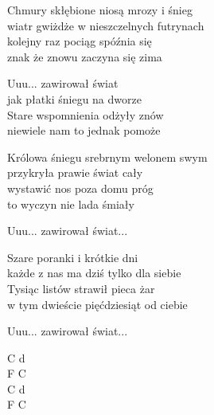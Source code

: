 \begin{text}
    Chmury skłębione niosą mrozy i śnieg\\
    wiatr gwiżdże w nieszczelnych futrynach\\
    kolejny raz pociąg spóźnia się\\
    znak że znowu zaczyna się zima

    \vin Uuu... zawirował świat\\
    \vin jak płatki śniegu na dworze\\
    \vin Stare wspomnienia odżyły znów\\
    \vin niewiele nam to jednak pomoże

    Królowa śniegu srebrnym welonem swym\\
    przykryła prawie świat cały\\
    wystawić nos poza domu próg\\
    to wyczyn nie lada śmiały

    \vin Uuu... zawirował świat...

    Szare poranki i krótkie dni\\
    każde z nas ma dziś tylko dla siebie\\
    Tysiąc listów strawił pieca żar\\
    w tym dwieście pięćdziesiąt od ciebie

    \vin Uuu... zawirował świat...
\end{text}
\begin{chord}
    C d\\
    F C\\
    C d\\
    F C
\end{chord}